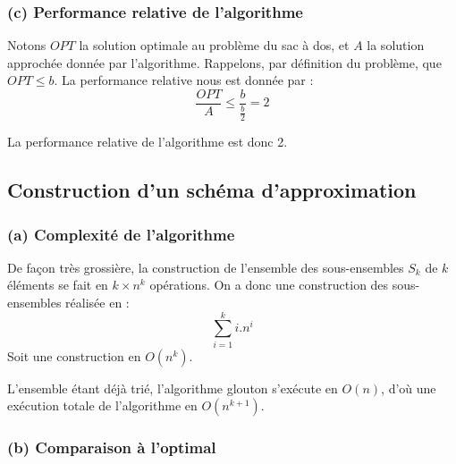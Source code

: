 \subsubsection{(c) Performance relative de l'algorithme}

Notons $OPT$ la solution optimale au problème du sac à dos, et $A$ la solution approchée donnée par
l'algorithme. Rappelons, par définition du problème, que $OPT \leq b $. La performance relative nous
est donnée par : $$
\frac{OPT}{A} \leq \frac{b}{\frac{b}{2}} = 2 $$

La performance relative de l'algorithme est donc 2.

\subsection{Construction d'un schéma d'approximation}

\subsubsection{(a) Complexité de l'algorithme}

De façon très grossière, la construction de l'ensemble des sous-ensembles $S_k$ de $k$ éléments se
fait en $k\times n^k$ opérations. On a donc une construction des sous-ensembles réalisée en : 
$$\sum_{i=1}^k i . n^i $$
Soit une construction en $O(n^k)$.

L'ensemble étant déjà trié, l'algorithme glouton s'exécute en $O(n)$, d'où une exécution totale de
l'algorithme en $O(n^{k+1})$.


\subsubsection{(b) Comparaison à l'optimal}

